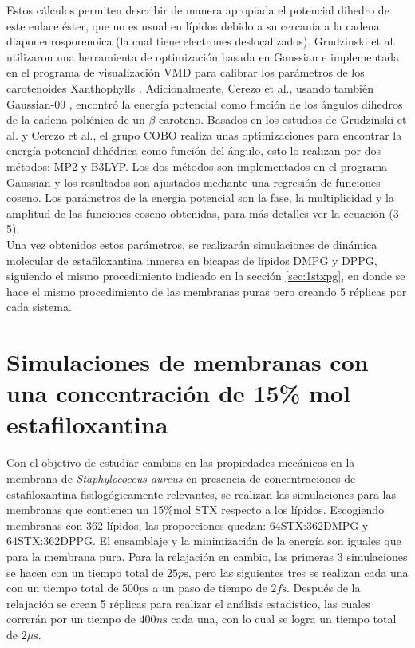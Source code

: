 Estos c\'{a}lculos permiten describir de manera apropiada el potencial dihedro de este enlace \'{e}ster, que no es usual en l\'{i}pidos debido a su cercan\'{i}a a la cadena diaponeurosporenoica (la cual tiene electrones deslocalizados). Grudzinski et al. \cite{Grudzinski2017LocalizationBilayer} utilizaron una herramienta de optimizaci\'{o}n basada en Gaussian e implementada en el programa de visualizaci\'{o}n VMD para calibrar los par\'{a}metros de los carotenoides Xanthophylls \cite{Grudzinski2017LocalizationBilayer}. Adicionalmente, Cerezo et al., usando tambi\'{e}n Gaussian-09 \cite{Cerezo2012AntioxidantSimulations}, encontr\'{o} la energ\'{i}a potencial como funci\'{o}n de los \'{a}ngulos dihedros de la cadena poli\'{e}nica de un $\beta$-caroteno. Basados en los estudios de Grudzinski et al. y Cerezo et al., el grupo COBO realiza unas optimizaciones para encontrar la energ\'{i}a potencial dih\'{e}drica como funci\'{o}n del \'{a}ngulo, esto lo realizan por dos m\'{e}todos: MP2  y B3LYP. Los dos m\'{e}todos son implementados en el programa Gaussian y los resultados son ajustados mediante una regresi\'{o}n de funciones coseno. Los par\'{a}metros de la energ\'{i}a potencial son la fase, la multiplicidad y la amplitud de las funciones coseno obtenidas, para m\'{a}s detalles ver la ecuaci\'{o}n (3-5).\\

Una vez obtenidos estos par\'{a}metros, se realizar\'{a}n simulaciones de din\'{a}mica molecular de estafiloxantina inmersa en bicapas de l\'{i}pidos DMPG y DPPG, siguiendo el mismo procedimiento indicado en la secci\'{o}n \ref{sec:1stxpg}, en donde se hace el mismo procedimiento de las membranas puras pero creando 5 r\'{e}plicas por cada sistema.\\

\section{Simulaciones de membranas con una concentraci\'{o}n de 15\% mol estafiloxantina}
Con el objetivo  de estudiar cambios en las propiedades mec\'{a}nicas en la membrana  de \textit{Staphylococcus aureus} en presencia de concentraciones de estafiloxantina fisilog\'{o}gicamente relevantes, se realizan las simulaciones para las membranas que contienen un 15\%mol STX respecto a los l\'{i}pidos. Escogiendo membranas con 362 l\'{i}pidos, las proporciones quedan: 64STX:362DMPG y 64STX:362DPPG. El ensamblaje y la minimizaci\'{o}n de la energ\'{i}a son iguales que para la membrana pura. Para la relajaci\'{o}n en cambio, las primeras 3 simulaciones se hacen con un tiempo total de $25p\mathrm{s}$, pero las siguientes tres se realizan cada una con un tiempo total de $500p\mathrm{s}$ a un paso de tiempo de $2f\mathrm{s}$. Despu\'{e}s de la relajaci\'{o}n se crean 5 r\'{e}plicas para realizar el an\'{a}lisis estad\'{i}stico, las cuales correr\'{a}n por un tiempo de $400n\mathrm{s}$ cada una, con lo cual se logra un tiempo total de $2\mu\mathrm{s}$.\\

